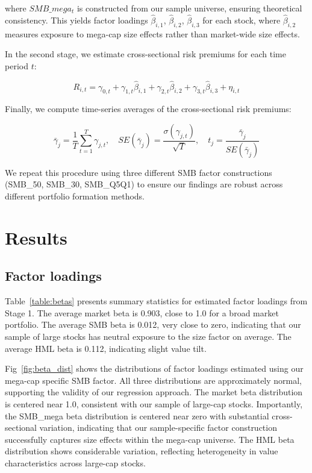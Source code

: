 \documentclass[10pt,letterpaper]{article}
\begin{document}
where $SMB\_mega_t$ is constructed from our sample universe, ensuring theoretical consistency. This yields factor loadings $\hat{\beta}_{i,1}$, $\hat{\beta}_{i,2}$, $\hat{\beta}_{i,3}$ for each stock, where $\hat{\beta}_{i,2}$ measures exposure to mega-cap size effects rather than market-wide size effects.

In the second stage, we estimate cross-sectional risk premiums for each time period $t$:

\begin{equation}
R_{i,t} = \gamma_{0,t} + \gamma_{1,t}\hat{\beta}_{i,1} + \gamma_{2,t}\hat{\beta}_{i,2} + \gamma_{3,t}\hat{\beta}_{i,3} + \eta_{i,t}
\label{eq:stage2}
\end{equation}

Finally, we compute time-series averages of the cross-sectional risk premiums:

\begin{equation}
\bar{\gamma}_j = \frac{1}{T}\sum_{t=1}^{T}\gamma_{j,t}, \quad SE(\bar{\gamma}_j) = \frac{\sigma(\gamma_{j,t})}{\sqrt{T}}, \quad t_j = \frac{\bar{\gamma}_j}{SE(\bar{\gamma}_j)}
\label{eq:stage3}
\end{equation}

We repeat this procedure using three different SMB factor constructions (SMB\_50, SMB\_30, SMB\_Q5Q1) to ensure our findings are robust across different portfolio formation methods.

\section*{Results}

\subsection*{Factor loadings}

Table~\ref{table:betas} presents summary statistics for estimated factor loadings from Stage 1. The average market beta is 0.903, close to 1.0 for a broad market portfolio. The average SMB beta is 0.012, very close to zero, indicating that our sample of large stocks has neutral exposure to the size factor on average. The average HML beta is 0.112, indicating slight value tilt.

Fig~\ref{fig:beta_dist} shows the distributions of factor loadings estimated using our mega-cap specific SMB factor. All three distributions are approximately normal, supporting the validity of our regression approach. The market beta distribution is centered near 1.0, consistent with our sample of large-cap stocks. Importantly, the SMB\_mega beta distribution is centered near zero with substantial cross-sectional variation, indicating that our sample-specific factor construction successfully captures size effects within the mega-cap universe. The HML beta distribution shows considerable variation, reflecting heterogeneity in value characteristics across large-cap stocks.
\end{document}
